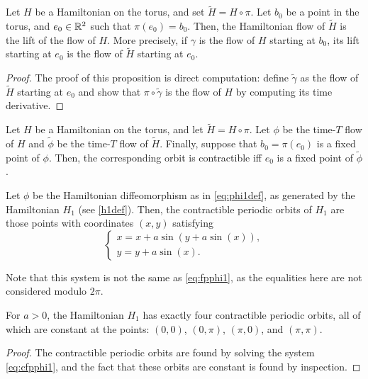 \begin{prop}
Let $H$ be a Hamiltonian on the torus, and set $\tilde H = H \circ \pi$. Let $b_0$ be a point in the torus, and $e_0 \in \mathbb{R}^2$ such that $\pi(e_0) = b_0$. Then, the Hamiltonian flow of $\tilde H$ is the lift of the flow of $H$. More precisely, if $\gamma$ is the flow of $H$ starting at $b_0$, its lift starting at $e_0$ is the flow of $\tilde H$ starting at $e_0$.
\end{prop}

\begin{proof}
The proof of this proposition is direct computation: define $\tilde \gamma$ as the flow of $\tilde H$ starting at $e_0$ and show that $\pi \circ \tilde \gamma$ is the flow of $H$ by computing its time derivative.
\end{proof}

\begin{corollary}
Let $H$ be a Hamiltonian on the torus, and let $\tilde H = H \circ \pi$. Let $\phi$ be the time-$T$ flow of $H$ and $\tilde \phi$ be the time-$T$ flow of $\tilde H$. Finally, suppose that $b_0 = \pi(e_0)$ is a fixed point of $\phi$. Then, the corresponding orbit is contractible iff $e_0$ is a fixed point of $\tilde\phi$.
\end{corollary}

\begin{corollary}
Let $\phi$ be the Hamiltonian diffeomorphism as in \eqref{eq:phi1def}, as generated by the Hamiltonian $H_1$ (see \eqref{h1def}). Then, the contractible periodic orbits of $H_1$	 are those points with coordinates $(x,y)$ satisfying
\begin{equation}\label{eq:cfpphi1}
\begin{cases}
x = x + a \sin(y + a \sin(x)),\\
y = y + a \sin(x).
\end{cases}
\end{equation}

Note that this system is not the same as \eqref{eq:fpphi1}, as the equalities here are not considered modulo $2\pi$.	
\end{corollary}

\begin{prop}
For $a > 0$, the Hamiltonian $H_1$ has exactly four contractible periodic orbits, all of which are constant at the points: $(0,0)$, $(0,\pi)$, $(\pi,0)$, and $(\pi,\pi)$.
\end{prop}

\begin{proof}
The contractible periodic orbits are found by solving the system \eqref{eq:cfpphi1}, and the fact that these orbits are constant is found by inspection.
\end{proof}

